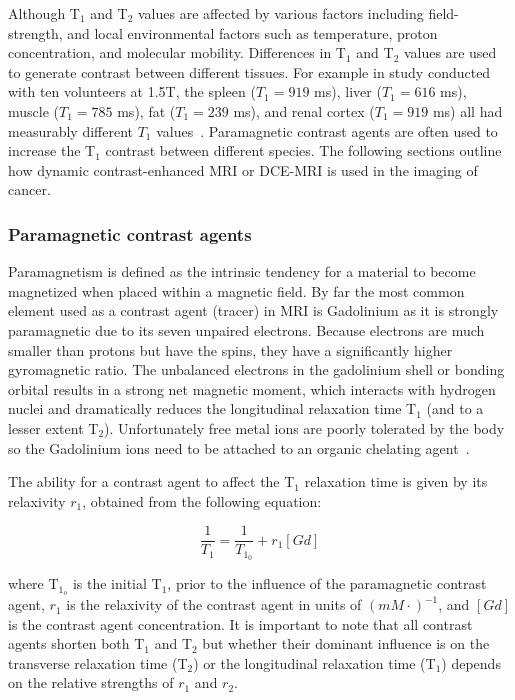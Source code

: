 Although T$_1$ and T$_2$ values are affected by various factors including field-strength, and local environmental factors such as temperature, proton concentration, and molecular mobility. 
Differences in T$_1$ and T$_2$ values are used to generate contrast between different tissues. 
For example in study conducted with ten volunteers at 1.5T, the spleen ($T_1 = 919$ ms), liver ($T_1 = 616$ ms), muscle ($T_1 = 785$ ms), fat ($T_1 = 239$ ms), and renal cortex ($T_1 = 919$ ms) all had measurably different $T_1$ values~\cite{OConnor:2009ku}.
Paramagnetic contrast agents are often used to increase the T$_1$ contrast between different species. 
The following sections outline how dynamic contrast-enhanced MRI or \acs{DCE-MRI} is used in the imaging of cancer.

\subsubsection{Paramagnetic contrast agents}

Paramagnetism is defined as the intrinsic tendency for a material to become magnetized when placed within a magnetic field.
By far the most common element used as a contrast agent (tracer) in MRI is Gadolinium as it is strongly paramagnetic due to its seven unpaired electrons.
Because electrons are much smaller than protons but have the spins, they have a significantly higher gyromagnetic ratio.
The unbalanced electrons in the gadolinium shell or bonding orbital results in a strong net magnetic moment, which interacts with hydrogen nuclei and dramatically reduces the longitudinal relaxation time T$_1$ (and to a lesser extent T$_2$).
Unfortunately free metal ions are poorly tolerated by the body so the Gadolinium ions need to be attached to an organic chelating agent~\cite{DeLeonRodriguez:2015bl}.

The ability for a contrast agent to affect the T$_1$ relaxation time is given by its relaxivity $r_1$, obtained from the following equation:

\begin{equation}
\frac{1}{T_{1}} = \frac{1}{T_{1_0}} + r_1 [Gd]
\end{equation}

where T$_{1_o}$ is the initial T$_1$, prior to the influence of the paramagnetic contrast agent, $r_1$ is the relaxivity of the contrast agent in units of $(mM\cdot)^{-1}$, and $[Gd]$ is the contrast agent concentration.
It is important to note that all contrast agents shorten both T$_1$ and T$_2$ but whether their dominant influence is on the transverse relaxation time (T$_2$) or the longitudinal relaxation time (T$_1$) depends on the relative strengths of $r_1$ and $r_2$.

